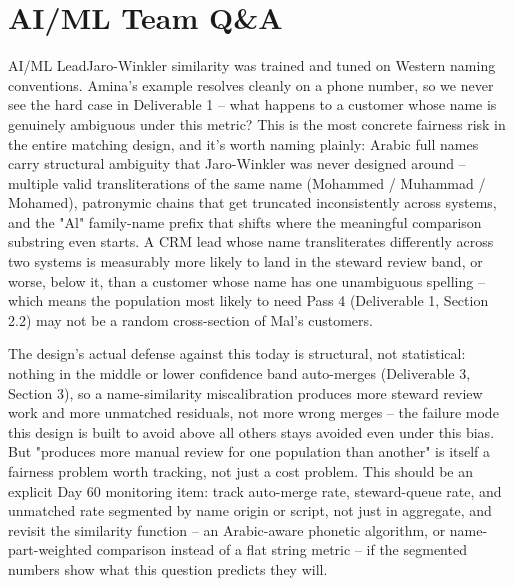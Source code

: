 \documentclass[11pt]{article}
\begin{document}
\section{AI/ML Team Q\&A}
\label{sec:aiml}
\begin{stakeholderq}{AI/ML Lead}{Jaro-Winkler similarity was trained and tuned on Western naming conventions. Amina's example resolves cleanly on a phone number, so we never see the hard case in Deliverable 1 -- what happens to a customer whose name is genuinely ambiguous under this metric?}
This is the most concrete fairness risk in the entire matching design, and it's worth naming plainly: Arabic full names carry structural ambiguity that Jaro-Winkler was never designed around -- multiple valid transliterations of the same name (Mohammed / Muhammad / Mohamed), patronymic chains that get truncated inconsistently across systems, and the "Al" family-name prefix that shifts where the meaningful comparison substring even starts. A CRM lead whose name transliterates differently across two systems is measurably more likely to land in the steward review band, or worse, below it, than a customer whose name has one unambiguous spelling -- which means the population most likely to need Pass 4 (Deliverable 1, Section 2.2) may not be a random cross-section of Mal's customers.

The design's actual defense against this today is structural, not statistical: nothing in the middle or lower confidence band auto-merges (Deliverable 3, Section 3), so a name-similarity miscalibration produces more steward review work and more unmatched residuals, not more wrong merges -- the failure mode this design is built to avoid above all others stays avoided even under this bias. But "produces more manual review for one population than another" is itself a fairness problem worth tracking, not just a cost problem. This should be an explicit Day 60 monitoring item: track auto-merge rate, steward-queue rate, and unmatched rate segmented by name origin or script, not just in aggregate, and revisit the similarity function -- an Arabic-aware phonetic algorithm, or name-part-weighted comparison instead of a flat string metric -- if the segmented numbers show what this question predicts they will.
\end{stakeholderq}
\end{document}
